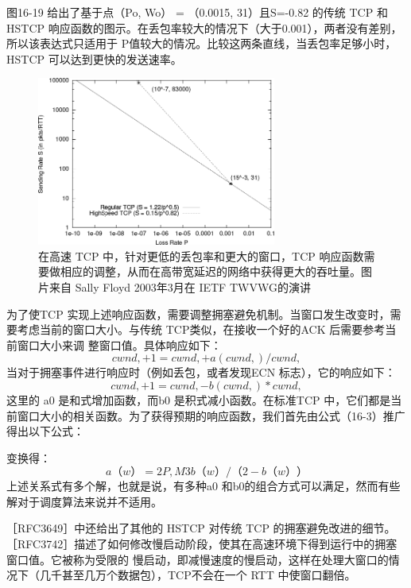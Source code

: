 图16-19 给出了基于点（Po, Wo） = （0.0015, 31）且S=-0.82 的传统 TCP 和 HSTCP 响应函数的图示。在丢包率较大的情况下（大于0.001），两者没有差别，所以该表达式只适用于
P值较大的情况。比较这两条直线，当丢包率足够小时，HSTCP 可以达到更快的发送速率。

\begin{figure}[!htb]
    \centering
	\includegraphics[width=0.7\textwidth]{imgs/16/16-19.png}
	\caption{在高速 TCP 中，针对更低的丢包率和更大的窗口，TCP 响应函数需要做相应的调整，从而在高带宽延迟的网络中获得更大的吞吐量。图片来自 Sally Floyd 2003年3月在 IETF TWVWG的演讲}
\end{figure}

为了使TCP 实现上述响应函数，需要调整拥塞避免机制。当窗口发生改变时，需要考虑当前的窗口大小。与传统 TCP类似，在接收一个好的ACK 后需要参考当前窗口大小来调
整窗口值。具体响应如下：
\begin{equation}
    cwnd, + 1 = cwnd, + a (cwnd,) /cwnd,
\end{equation}
当对于拥塞事件进行响应时（例如丢包，或者发现ECN 标志），它的响应如下：
\begin{equation}
    cwnd, + 1 = cwnd, - b (cwnd,) * cwnd,
\end{equation}
这里的 a0 是和式增加函数，而b0 是积式减小函数。在标准TCP 中，它们都是当前窗口大小的相关函数。为了获得预期的响应函数，我们首先由公式（16-3）推广得出以下公式：

变换得：
\begin{equation}
    a （w）=2P,M3b （w）/（2-b（w））
\end{equation}
上述关系式有多个解，也就是说，有多种a0 和b0的组合方式可以满足，然而有些解对于调度算法来说并不适用。

［RFC3649］中还给出了其他的 HSTCP 对传统 TCP 的拥塞避免改进的细节。［RFC3742］描述了如何修改慢启动阶段，使其在高速环境下得到运行中的拥塞窗口值。它被称为受限的
慢启动，即减慢速度的慢启动，这样在处理大窗口的情况下（几千甚至几万个数据包），TCP不会在一个 RTT 中使窗口翻倍。

